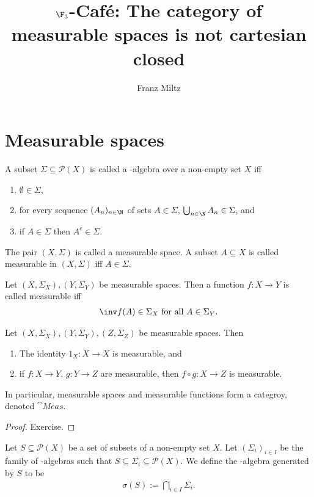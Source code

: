 \documentclass{article}
\title{$\F_3$-Caf\'e: The category of measurable spaces is not cartesian closed}
\author{Franz Miltz}
\begin{document}
\maketitle

\section{Measurable spaces}

\begin{definition}
	A subset $\Sigma\subseteq\mathcal{P}(X)$ is called a \sigma-algebra over a non-empty set $X$
	iff
	\begin{enumerate}
		\item $\emptyset\in\Sigma$,
		\item for every sequence $(A_n)_{n\in\N}$ of sets $A\in\Sigma$, $\bigcup_{n\in\N}A_n\in\Sigma$, and 
		\item if $A\in\Sigma$ then $A^c\in\Sigma$. 
	\end{enumerate}
	The pair $(X,\Sigma)$ is called a measurable space. A subset $A\subseteq X$ is called measurable
	in $(X,\Sigma)$ iff $A\in\Sigma$.
\end{definition}

\begin{definition}
	Let $(X, \Sigma_X),(Y,\Sigma_Y)$ be measurable spaces. Then a function $f:X\to Y$ is called measurable
	iff 
	\begin{align}
		\label{measurable_cond}
		\inv f(A)\in \Sigma_X \text{ for all }A\in\Sigma_Y.
	\end{align}
\end{definition}

\begin{proposition}
	Let $(X,\Sigma_X),(Y,\Sigma_Y),(Z,\Sigma_Z)$ be measurable spaces. Then
	\begin{enumerate}
		\item The identity $1_X:X\to X$ is measurable, and
		\item if $f:X\to Y$, $g:Y\to Z$ are measurable, then $f\circ g:X\to Z$ is measurable.
	\end{enumerate}
	In particular, measurable spaces and measurable functions form a categroy, denoted $\cat{Meas}$.
	\begin{proof}
		Exercise.
	\end{proof}
\end{proposition}

\begin{definition}
	Let $S\subseteq\mathcal{P}(X)$ be a set of subsets of a non-empty set $X$. Let $(\Sigma_i)_{i\in I}$
	be the family of \sigma-algebras such that $S\subseteq\Sigma_i\subseteq\mathcal{P}(X)$.
	We define the 
	\sigma-algebra generated by $S$ to be 
	\begin{align*}
		\sigma(S):=\bigcap_{i\in I}\Sigma_i.
	\end{align*} 
\end{definition}
\end{document}
